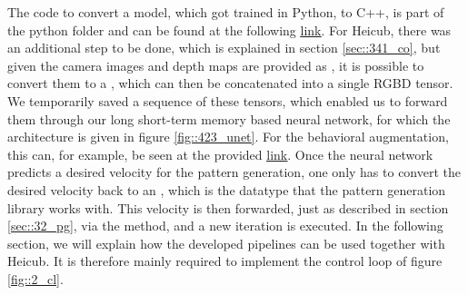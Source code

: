 The code to convert a model, which got trained in Python, to C++, is part of the python folder and can be found at the following \href{https://github.com/mhubii/nmpc_pattern_generator/blob/master/libs/learning/python/python_to_cpp.py}{\underline{link}}. For Heicub, there was an additional step to be done, which is explained in section \ref{sec::341_co}, but given the camera images and depth maps are provided as , it is possible to convert them to a , which can then be concatenated into a single RGBD tensor. We temporarily saved a sequence of these tensors, which enabled us to forward them through our long short-term memory based neural network, for which the architecture is given in figure \ref{fig::423_unet}. For the behavioral augmentation, this can, for example, be seen at the provided \href{https://github.com/mhubii/nmpc_pattern_generator/blob/719fde0bb73925923de85cbf379c5523e075dfeb/src/behavioural_augmentation_real_robot_external_data.cpp#L625}{\underline{link}}. Once the neural network predicts a desired velocity for the pattern generation, one only has to convert the desired velocity back to an , which is the datatype that the pattern generation library works with. This velocity is then forwarded, just as described in section \ref{sec::32_pg}, via the  method, and a new iteration is executed. In the following section, we will explain how the developed pipelines can be used together with Heicub. It is therefore mainly required to implement the control loop of figure \ref{fig::2_cl}. 